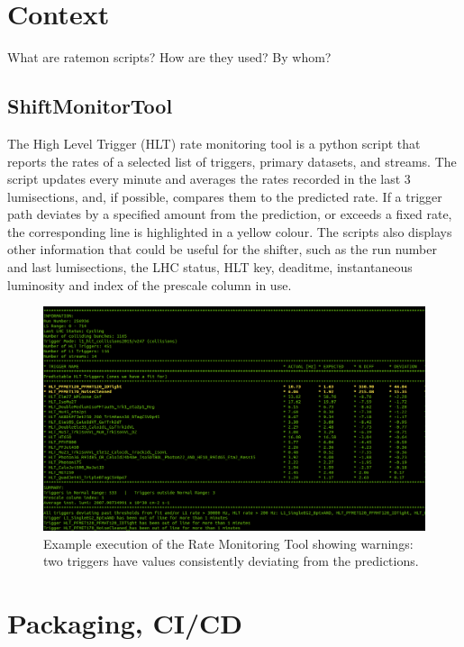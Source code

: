 \section{Context}

What are ratemon scripts? How are they used? By whom?

\subsection{ShiftMonitorTool}

The High Level Trigger (HLT) rate monitoring tool is a python script that reports the rates of a selected list of triggers, primary datasets, and streams. The script updates every minute and averages the rates recorded in the last 3 lumisections, and, if possible, compares them to the predicted rate. If a trigger path deviates by a specified amount from the prediction, or exceeds a fixed rate, the corresponding line is highlighted in a yellow colour. The scripts also displays other information that could be useful for the shifter, such as the run number and last lumisections, the LHC status, HLT key, deaditme, instantaneous luminosity and index of the prescale column in use.

\begin{figure}
	\centerline{
		\includegraphics[width=0.8\paperwidth]{figures/ratemon_warnings}}
	\caption{Example execution of the Rate Monitoring Tool showing warnings: two triggers have values consistently deviating from the predictions. \cite{ratemon-twiki}}
	\label{fig:ratemon_warnings}
\end{figure}

\section{Packaging, CI/CD}

